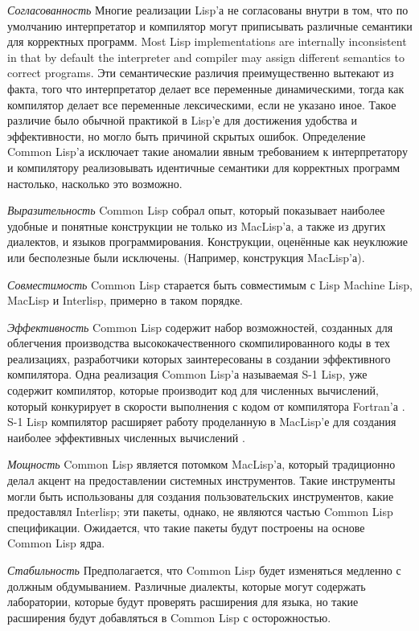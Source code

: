 \begin{flushdesc}
\item[\emph{Согласованность}]
Многие реализации Lisp'а не согласованы внутри в том, что по
умолчанию интерпретатор и компилятор могут приписывать различные
семантики для корректных программ.
Most Lisp implementations are internally inconsistent
in that by default the interpreter and compiler may assign different
semantics to correct programs.
Эти семантические различия преимущественно вытекают из факта, того
что интерпретатор делает все переменные динамическими, тогда как
компилятор делает все переменные лексическими, если не указано
иное. Такое различие было обычной практикой в Lisp'е для
достижения удобства и эффективности, но могло быть причиной скрытых
ошибок. Определение Common Lisp'а исключает такие аномалии явным
требованием к интерпретатору и компилятору реализовывать
идентичные семантики для корректных программ настолько, насколько
это возможно.

\item[\emph{Выразительность}]
Common Lisp собрал опыт, который показывает наиболее удобные и
понятные конструкции не только из MacLisp'а, а также из других
диалектов, и языков программирования. Конструкции, оценённые как
неуклюжие или бесполезные были исключены. (Например, 
конструкция MacLisp'а).

\item[\emph{Совместимость}]
Common Lisp старается быть совместимым с Lisp Machine Lisp,
MacLisp и Interlisp, примерно в таком порядке.

\item[\emph{Эффективность}]
Common Lisp содержит набор возможностей, созданных для облегчения
производства высококачественного скомпилированного коды в тех
реализациях, разработчики которых заинтересованы в создании
эффективного компилятора. Одна реализация Common Lisp'а называемая
S-1 Lisp, уже содержит компилятор, которые производит код для
численных вычислений, который конкурирует в скорости выполнения
с кодом от компилятора Fortran'а \cite{S1-COMPILER}. S-1 Lisp
компилятор расширяет работу проделанную в MacLisp'е для создания
наиболее эффективных численных вычислений \cite{MACLISP-BEATS-FORTRAN}.

\item[\emph{Мощность}]
Common Lisp является потомком MacLisp'а, который традиционно делал
акцент на предоставлении системных инструментов. Такие инструменты
могли быть использованы для создания пользовательских
инструментов, какие предоставлял Interlisp; эти пакеты, однако, не
являются частью Common Lisp спецификации. Ожидается, что
такие пакеты будут построены на основе Common Lisp ядра.

\item[\emph{Стабильность}]
Предполагается, что Common Lisp будет изменяться медленно с
должным обдумыванием. Различные диалекты, которые могут содержать
лаборатории, которые будут проверять расширения для языка, но
такие расширения будут добавляться в Common Lisp с осторожностью.
\end{flushdesc}


